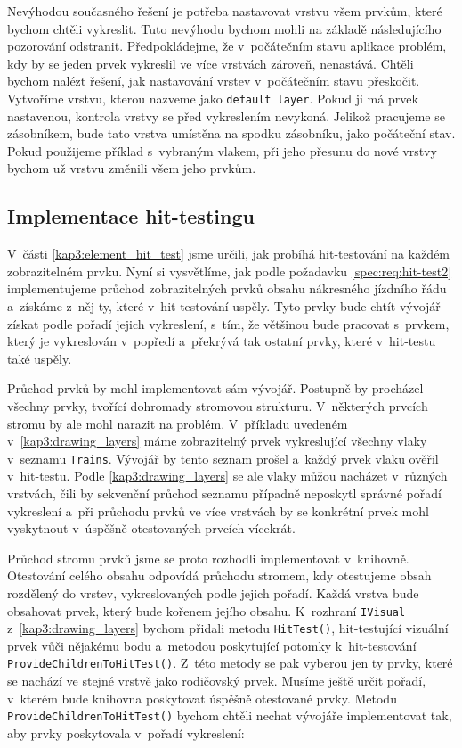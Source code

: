 Nevýhodou současného řešení je potřeba nastavovat vrstvu všem prvkům, které bychom chtěli vykreslit. Tuto nevýhodu bychom mohli na základě následujícího pozorování odstranit. Předpokládejme, že v~počátečním stavu aplikace problém, kdy by se jeden prvek vykreslil ve více vrstvách zároveň, nenastává. Chtěli bychom nalézt řešení, jak nastavování vrstev v~počátečním stavu přeskočit. Vytvoříme vrstvu, kterou nazveme jako \texttt{default layer}. Pokud ji má prvek nastavenou, kontrola vrstvy se před vykreslením nevykoná. Jelikož pracujeme se zásobníkem, bude tato vrstva umístěna na spodku zásobníku, jako počáteční stav. Pokud použijeme příklad s~vybraným vlakem, při jeho přesunu do nové vrstvy bychom už vrstvu změnili všem jeho prvkům.

\subsection{Implementace hit-testingu}
\label{kap3:hit_test_tree}
V~části \ref{kap3:element_hit_test} jsme určili, jak probíhá hit-testování na každém zobrazitelném prvku. Nyní si vysvětlíme, jak podle požadavku \ref{spec:req:hit-test2} implementujeme průchod zobrazitelných prvků obsahu nákresného jízdního řádu a~získáme z~něj ty, které v~hit-testování uspěly. Tyto prvky bude chtít vývojář získat podle pořadí jejich vykreslení, s~tím, že většinou bude pracovat s~prvkem, který je vykreslován v~popředí a~překrývá tak ostatní prvky, které v~hit-testu také uspěly. 

Průchod prvků by mohl implementovat sám vývojář. Postupně by procházel všechny prvky, tvořící dohromady stromovou strukturu. V~některých prvcích stromu by ale mohl narazit na problém. V~příkladu uvedeném v~\ref{kap3:drawing_layers} máme zobrazitelný prvek vykreslující všechny vlaky v~seznamu \texttt{Trains}. Vývojář by tento seznam prošel a~každý prvek vlaku ověřil v~hit-testu. Podle \ref{kap3:drawing_layers} se ale vlaky můžou nacházet v~různých vrstvách, čili by sekvenční průchod seznamu případně neposkytl správné pořadí vykreslení a~při průchodu prvků ve více vrstvách by se konkrétní prvek mohl vyskytnout v~úspěšně otestovaných prvcích vícekrát.

Průchod stromu prvků jsme se proto rozhodli implementovat v~knihovně. Otestování celého obsahu odpovídá průchodu stromem, kdy otestujeme obsah rozdělený do vrstev, vykreslovaných podle jejich pořadí. Každá vrstva bude obsahovat prvek, který bude kořenem jejího obsahu. K~rozhraní \texttt{IVisual} z~\ref{kap3:drawing_layers} bychom přidali metodu \texttt{HitTest()}, hit-testující vizuální prvek vůči nějakému bodu a~metodou poskytující potomky k~hit-testování \texttt{ProvideChildrenToHitTest()}. Z~této metody se pak vyberou jen ty prvky, které se nachází ve stejné vrstvě jako rodičovský prvek. Musíme ještě určit pořadí, v~kterém bude knihovna poskytovat úspěšně otestované prvky. Metodu \texttt{ProvideChildrenToHitTest()} bychom chtěli nechat vývojáře implementovat tak, aby prvky poskytovala v~pořadí vykreslení:

